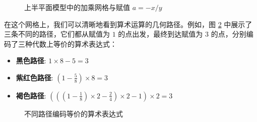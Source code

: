 \documentclass[a4paper,12pt]{book}
\numberwithin{problem}{section}
\numberwithin{definition}{section}
\numberwithin{lemma}{section}
\numberwithin{proposition}{section}
\numberwithin{theorem}{section}
\numberwithin{grammar}{section}
\numberwithin{program}{section}
\numberwithin{convention}{section}
\numberwithin{corollary}{section}
\begin{document}
\begin{figure}[ht]
    \centering
    \caption{上半平面模型中的加乘网格与赋值 $a = -x/y$}
    \label{fig:assignment1}
\end{figure}

在这个网格上，我们可以清晰地看到算术运算的几何路径。例如，图 \ref{fig:encoding} 中展示了三条不同的路径，它们都从赋值为 $1$ 的点出发，最终到达赋值为 $3$ 的点，分别编码了三种代数上等价的算术表达式：
\begin{itemize}
    \item \textbf{黑色路径}: $1 \times 8 - 5 = 3$
    \item \textbf{紫红色路径}: $(1 - \frac{5}{8}) \times 8 = 3$
    \item \textbf{褐色路径}: $(((1 - \frac{1}{8}) \times 2 - \frac{2}{4}) \times 2 - 1) \times 2 = 3$
\end{itemize}

\begin{figure}[ht]
    \centering
    \caption{不同路径编码等价的算术表达式}
    \label{fig:encoding}
\end{figure}
\end{document}
